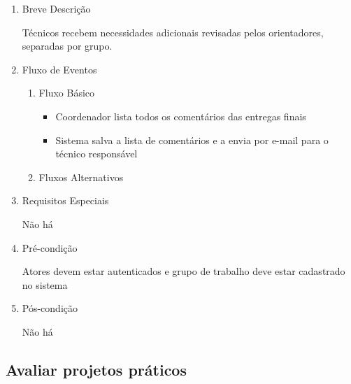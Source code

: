 \begin{enumerate}
    \item Breve Descrição


Técnicos recebem necessidades adicionais revisadas pelos orientadores, separadas por grupo.


    \item Fluxo de Eventos

\begin{enumerate}
    \item Fluxo Básico

\begin{itemize}
    \item Coordenador lista todos os comentários das entregas finais

    \item Sistema salva a lista de comentários e a envia por e-mail para o técnico responsável
\end{itemize}

    \item Fluxos Alternativos



\end{enumerate}
    \item Requisitos Especiais


Não há


    \item Pré-condição


Atores devem estar autenticados e grupo de trabalho deve estar cadastrado no sistema


    \item Pós-condição

    Não há
\end{enumerate}






















\subsection{Avaliar projetos práticos}


